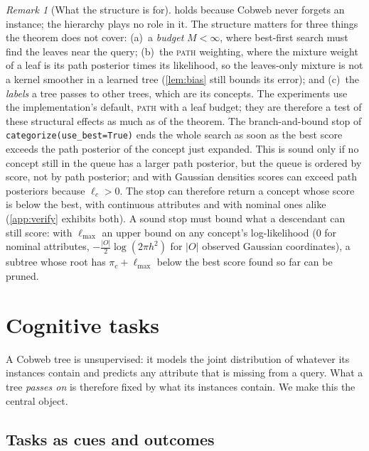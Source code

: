 \documentclass[11pt]{article}
\theoremstyle{definition}
\theoremstyle{remark}
\newtheorem{remark}[theorem]{Remark}
\begin{document}
\begin{remark}[What the structure is for]\label{rem:structure}
 holds because Cobweb never forgets an instance; the hierarchy
plays no role in it.  The structure matters for three things the theorem does not
cover: (a)~a \emph{budget} $M<\infty$, where best-first search must find the leaves
near the query; (b)~the \textsc{path} weighting, where the mixture weight of a leaf is
its path posterior times its likelihood, so the leaves-only mixture is not a kernel
smoother in a learned tree (\cref{lem:bias} still bounds its error); and (c)~the
\emph{labels} a tree passes to other trees, which are its concepts.  The experiments use
the implementation's default, \textsc{path} with a leaf budget; they are therefore a
test of these structural effects as much as of the theorem.  The branch-and-bound stop
of \texttt{categorize(use\_best=True)} ends the whole search as soon as the best score
exceeds the path posterior of the concept just expanded.  This is sound only if no concept
still in the queue has a larger path posterior, but the queue is ordered by score, not by
path posterior; and with Gaussian densities scores can exceed path posteriors because
$\ell_c>0$.  The stop can therefore return a concept whose score is below the best, with
continuous attributes and with nominal ones alike (\cref{app:verify} exhibits both).
A sound stop must bound what a descendant can still score: with $\ell_{\max}$ an upper
bound on any concept's log-likelihood ($0$ for nominal attributes,
$-\tfrac{|O|}2\log(2\pi h^2)$ for $|O|$ observed Gaussian coordinates), a subtree whose root
has $\pi_c+\ell_{\max}$ below the best score found so far can be pruned.
\end{remark}

\section{Cognitive tasks}\label{sec:tasks}

A Cobweb tree is unsupervised: it models the joint distribution of whatever its
instances contain and predicts any attribute that is missing from a query.  What a tree
\emph{passes on} is therefore fixed by what its instances contain.  We make this the
central object.

\subsection{Tasks as cues and outcomes}
\end{document}

